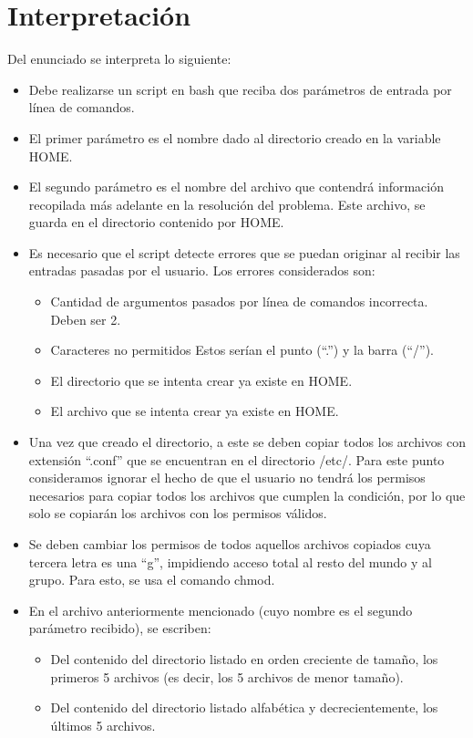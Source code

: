 \documentclass[12pt,a4paper]{article} %
\begin{document}
	\section{Interpretación}
	Del enunciado se interpreta lo siguiente:
	\begin{itemize}
	
	
    \item Debe realizarse un script en bash que reciba dos parámetros de entrada por línea de comandos.
    \item El primer parámetro es el nombre dado al directorio creado en la variable HOME.
    \item El segundo parámetro es el nombre del archivo que contendrá información recopilada más adelante en la resolución del problema. Este archivo, se guarda en el directorio contenido por HOME.
    \item Es necesario que el script detecte errores que se puedan originar al recibir las entradas pasadas por el usuario. Los errores considerados son:
    	\begin{itemize}
    		\item Cantidad de argumentos pasados por línea de comandos incorrecta. Deben ser 2.
            \item Caracteres no permitidos Estos serían el punto (“.”) y la barra (“/”).
            \item El directorio que se intenta crear ya existe en HOME.
            \item El archivo que se intenta crear ya existe en HOME.
    	\end{itemize}
            
    \item Una vez que creado el directorio, a este se deben copiar todos los archivos con extensión “.conf” que se encuentran en el directorio /etc/. Para este punto consideramos ignorar el hecho de que el usuario no tendrá los permisos necesarios para copiar todos los archivos que cumplen la condición, por lo que solo se copiarán los archivos con los permisos válidos.
    \item Se deben cambiar los permisos de todos aquellos archivos copiados cuya tercera letra es una “g”, impidiendo acceso total al resto del mundo y al grupo. Para esto, se usa el comando chmod.
    \item En el archivo anteriormente mencionado (cuyo nombre es el segundo parámetro recibido), se escriben:
    	\begin{itemize}
            \item Del contenido del directorio listado en orden creciente de tamaño, los primeros 5 archivos (es decir, los 5 archivos de menor tamaño).
            \item Del contenido del directorio listado alfabética y decrecientemente, los últimos 5 archivos. 	
		\end{itemize}    	 
	\end{itemize}
\end{document}
